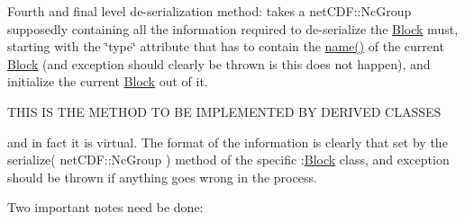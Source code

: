 Fourth and final level de-\/serialization method\+: takes a net\+C\+D\+F\+::\+Nc\+Group supposedly containing all the information required to de-\/serialize the \mbox{\hyperlink{class_s_m_spp__di__unipi__it_1_1_block}{Block}} must, starting with the \char`\"{}type\char`\"{} attribute that has to contain the \mbox{\hyperlink{class_s_m_spp__di__unipi__it_1_1_block_a738e9dfd6e00507da219e4bd5a3f6be9}{name()}} of the current \mbox{\hyperlink{class_s_m_spp__di__unipi__it_1_1_block}{Block}} (and exception should clearly be thrown is this does not happen), and initialize the current \mbox{\hyperlink{class_s_m_spp__di__unipi__it_1_1_block}{Block}} out of it. \begin{DoxyVerb} THIS IS THE METHOD TO BE IMPLEMENTED BY DERIVED CLASSES
\end{DoxyVerb}


and in fact it is virtual. The format of the information is clearly that set by the serialize( net\+C\+D\+F\+::\+Nc\+Group ) method of the specific \+:\mbox{\hyperlink{class_s_m_spp__di__unipi__it_1_1_block}{Block}} class, and exception should be thrown if anything goes wrong in the process.

Two important notes need be done\+:


